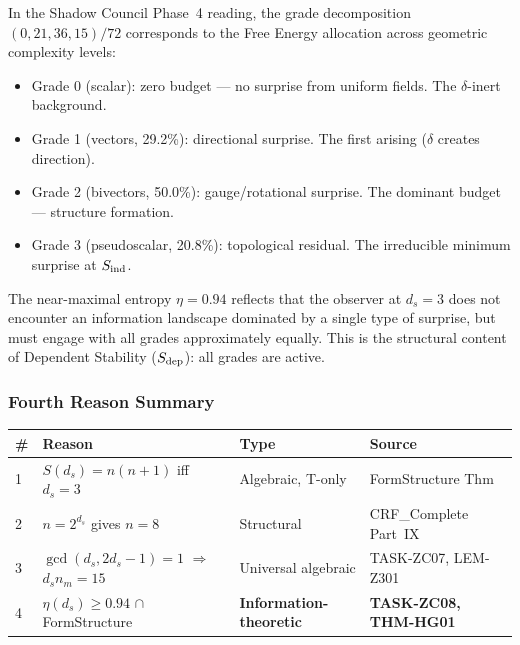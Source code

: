 \documentclass[12pt, a4paper]{article}
\begin{document}
In the Shadow Council Phase~4 reading, the grade decomposition
$(0, 21, 36, 15)/72$ corresponds to the Free Energy allocation
across geometric complexity levels:
\begin{itemize}[leftmargin=*]
  \item Grade 0 (scalar): zero budget --- no surprise from uniform
    fields. The $\delta$-inert background.
  \item Grade 1 (vectors, 29.2\%): directional surprise.
    The first arising ($\delta$ creates direction).
  \item Grade 2 (bivectors, 50.0\%): gauge/rotational surprise.
    The dominant budget --- structure formation.
  \item Grade 3 (pseudoscalar, 20.8\%): topological residual.
    The irreducible minimum surprise at $S_{\rm ind}$.
\end{itemize}

The near-maximal entropy $\eta = 0.94$ reflects that the observer
at $d_s = 3$ does not encounter an information landscape dominated
by a single type of surprise, but must engage with all grades
approximately equally. This is the structural content of
Dependent Stability ($S_{\rm dep}$): all grades are active.

\subsubsection{Fourth Reason Summary}

\begin{keybox}[title={Four Independent Reasons for $d_s = 3$
  (post-TASK-ZC08)}]
\begin{center}
{\small
\renewcommand{\arraystretch}{1.30}
\begin{tabular}{p{0.4cm} p{4.5cm} p{3.5cm} p{3.5cm}}
\toprule
\# & Reason & Type & Source \\
\midrule
1 & $S(d_s) = n(n+1)$ iff $d_s=3$ &
  Algebraic, T-only &
  FormStructure Thm \\
2 & $n = 2^{d_s}$ gives $n = 8$ &
  Structural &
  CRF\_Complete Part~IX \\
3 & $\gcd(d_s, 2d_s-1)=1$ $\Rightarrow$ $d_s n_m = 15$ &
  Universal algebraic &
  TASK-ZC07, LEM-Z301 \\
4 & $\eta(d_s) \geq 0.94$ $\cap$ FormStructure &
  \textbf{Information-theoretic} &
  \textbf{TASK-ZC08, THM-HG01} \\
\bottomrule
\end{tabular}
}
\end{center}
\end{keybox}
\end{document}
